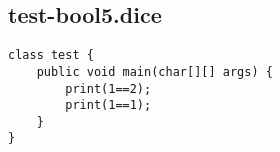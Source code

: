 \subsection{test-bool5.dice}
\begin{verbatim}
class test {
	public void main(char[][] args) {
		print(1==2);
		print(1==1);
	}
}
\end{verbatim}